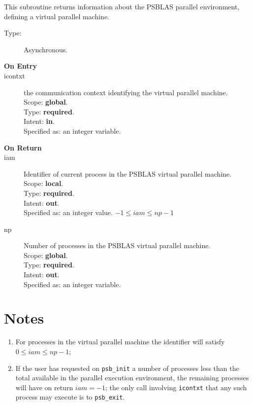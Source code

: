 
This subroutine returns information about  the PSBLAS parallel environment, defining
a virtual parallel machine.
\begin{description}
\item[Type:] Asynchronous.
\item[\bf  On Entry ]
\item[icontxt] the communication context identifying the virtual
  parallel machine.\\
Scope: {\bf global}.\\
Type: {\bf required}.\\
Intent: {\bf in}.\\
Specified as: an integer variable.
\end{description}

\begin{description}
\item[\bf On Return]
\item[iam] Identifier of current  process in the PSBLAS virtual parallel machine.\\
Scope: {\bf local}.\\
Type: {\bf required}.\\
Intent: {\bf out}.\\
Specified as: an integer value. $-1 \le iam \le np-1$\
\item[np] Number of processes in the PSBLAS virtual parallel machine.\\
Scope: {\bf global}.\\
Type: {\bf required}.\\
Intent: {\bf out}.\\
Specified as: an integer variable. \
\end{description}


\section*{Notes}
\begin{enumerate}
\item For processes in the virtual parallel machine  the identifier
  will satisfy $0 \le iam \le np-1$;
\item If the user has requested on \verb|psb_init| a number of
  processes less than the total available in the parallel execution
  environment, the remaining processes will have on return $iam=-1$;
  the only call involving \verb|icontxt| that any such process may
  execute is  to \verb|psb_exit|. 
\end{enumerate}


